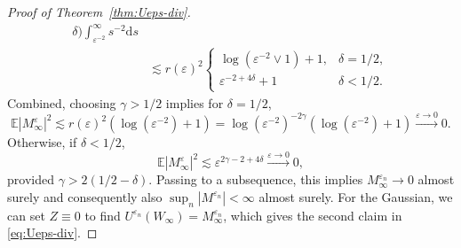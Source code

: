 \documentclass[11pt, a4paper]{scrartcl}
\numberwithin{equation}{section}
\theoremstyle{plain}
\theoremstyle{remark}
\newcommand{\mathd}{\mathrm{d}}
\begin{document}
\begin{proof}[Proof of Theorem~\ref{thm:Ueps-div}]
\[\begin{aligned}
{       \delta)} \int_{\varepsilon^{- 2}}^{\infty} s^{- 2} \mathd s\\
       & \lesssim  r (\varepsilon)^2 \begin{cases}
         \log (\varepsilon^{- 2} \vee 1) + 1, & \delta = 1 / 2,\\
         \varepsilon^{- 2 + 4 \delta} + 1 & \delta < 1 / 2.
       \end{cases}
     \end{aligned} \]
  Combined, choosing $\gamma > 1 / 2$ implies for $\delta = 1 / 2$,
  \[ \mathbb{E} | M_{\infty}^{\varepsilon} |^2 \lesssim r (\varepsilon)^2
     (\log (\varepsilon^{- 2}) + 1) = \log (\varepsilon^{- 2})^{- 2 \gamma}
     (\log (\varepsilon^{- 2}) + 1) \overset{\varepsilon \rightarrow
     0}{\longrightarrow} 0. \]
  Otherwise, if $\delta < 1 / 2$,
  \[ \mathbb{E} | M_{\infty}^{\varepsilon} |^2 \lesssim \varepsilon^{2 \gamma
     - 2 + 4 \delta} \overset{\varepsilon \rightarrow 0}{\longrightarrow} 0,
  \]
  provided $\gamma > 2 (1 / 2 - \delta) $. Passing to a subsequence, this
  implies $M^{\varepsilon_n}_{\infty} \rightarrow 0$ almost surely and
  consequently also $\sup_n | M^{\varepsilon_n} | < \infty$ almost surely.
  For the Gaussian, we can set $Z\equiv 0$ to find
  $U^{\varepsilon_n} (W_{\infty}) = M_{\infty}^{\varepsilon_n}$, which
  gives the second claim in \eqref{eq:Ueps-div}.
  

\end{proof}
\end{document}
